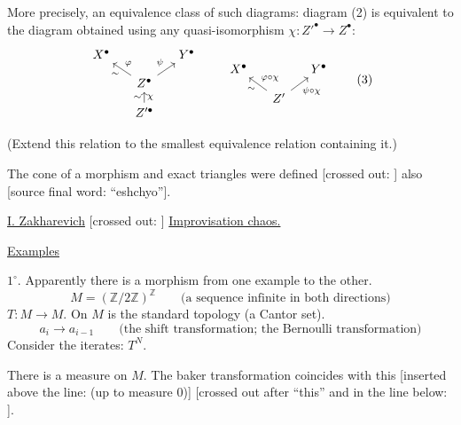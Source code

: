More precisely, an equivalence class of such diagrams: diagram (2) is equivalent to
the diagram obtained using any quasi-isomorphism
$\chi:Z'^\bullet\to Z^\bullet$:
\begin{equation*}
\begin{tikzcd}[column sep=small,row sep=small]
X^\bullet && Y^\bullet\\
& Z^\bullet \arrow[ul,"\varphi"',"\sim"] \arrow[ur,"\psi"] &\\
& Z'^\bullet \arrow[u,"\chi"',"\sim"] &
\end{tikzcd}
\qquad
\begin{tikzcd}[column sep=small,row sep=small]
X^\bullet && Y^\bullet\\
& Z' \arrow[ul,"{\varphi\circ\chi}"',"\sim"] \arrow[ur,"{\psi\circ\chi}"'] &
\end{tikzcd}
\tag{3}
\end{equation*}

(Extend this relation to the smallest equivalence relation containing it.)

The cone of a morphism and exact triangles were defined
[crossed out: ]
also [source final word: ``eshchyo''].


\underline{I. Zakharevich}
[crossed out: ]
\underline{Improvisation  chaos.}

\underline{Examples}

$1^{\circ}$. Apparently there is a morphism from one example to the other.
\begin{equation*}
M=(\mathbb{Z}/2\mathbb{Z})^{\mathbb{Z}}
\qquad\text{(a sequence infinite in both directions)}
\end{equation*}
$T\colon M\to M$. On $M$ is the standard topology (a Cantor set).
\begin{equation*}
a_i\to a_{i-1}\qquad\text{(the shift transformation; the Bernoulli transformation)}
\end{equation*}
Consider the iterates: $T^N$.

There is a measure on $M$. The baker transformation coincides with this
[inserted above the line: (up to measure $0$)]
[crossed out after ``this'' and in the line below:
].

\begin{center}
\end{center}

